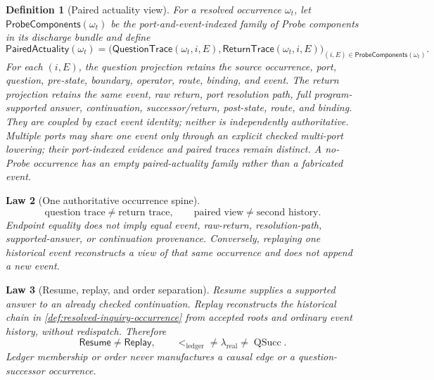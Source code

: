 \documentclass[11pt,oneside]{article}
\newtheorem{definition}{Definition}[section]
\newtheorem{law}[definition]{Law}
\newcommand{\QSucc}{\operatorname{QSucc}}
\begin{document}
\begin{definition}[Paired actuality view]\label{def:paired-actuality-view}
For a resolved occurrence \(\omega_t\), let \(\mathsf{ProbeComponents}(\omega_t)\) be the
port-and-event-indexed family of Probe components in its discharge bundle and define
\[
\boxed{
\mathsf{PairedActuality}(\omega_t)
=
\bigl(
\mathsf{QuestionTrace}(\omega_t,i,E),
\mathsf{ReturnTrace}(\omega_t,i,E)
\bigr)_{(i,E)\in\mathsf{ProbeComponents}(\omega_t)}.
}
\]
For each \((i,E)\), the question projection retains the source occurrence, port, question, pre-state,
boundary, operator, route, binding, and event.  The return projection retains the same event, raw
return, port resolution path, full program-supported answer, continuation, successor/return,
post-state, route, and binding.  They are coupled by exact event identity; neither is independently
authoritative.  Multiple ports may share one event only through an explicit checked multi-port
lowering; their port-indexed evidence and paired traces remain distinct.  A no-Probe occurrence has
an empty paired-actuality family rather than a fabricated event.
\end{definition}

\begin{law}[One authoritative occurrence spine]\label{law:one-occurrence-spine}
\[
\boxed{
\text{question trace}\neq\text{return trace},
\qquad
\text{paired view}\neq\text{second history}.
}
\]
Endpoint equality does not imply equal event, raw-return, resolution-path, supported-answer, or
continuation provenance.  Conversely, replaying one historical event reconstructs a view of that
same occurrence and does not append a new event.
\end{law}

\begin{law}[Resume, replay, and order separation]\label{law:resume-replay-order}
Resume supplies a supported answer to an already checked continuation.  Replay reconstructs the
historical chain in \cref{def:resolved-inquiry-occurrence} from accepted roots and ordinary event
history, without redispatch.  Therefore
\[
\boxed{
\mathsf{Resume}\neq\mathsf{Replay},
\qquad
<_{\mathrm{ledger}}\neq\lambda_{\mathrm{real}}\neq\QSucc.
}
\]
Ledger membership or order never manufactures a causal edge or a question-successor occurrence.
\end{law}
\end{document}
